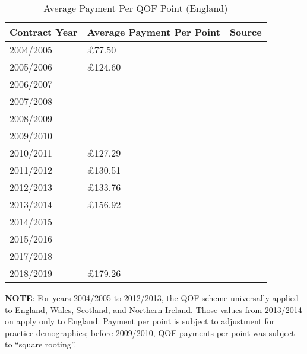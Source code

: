 \documentclass[12pt]{article}
\begin{document}
\begin{table}
  \caption{Average Payment Per QOF Point (England)}
  \begin{center}
      \begin{threeparttable}
      \begin{tabularx}{\textwidth}{|p{3cm}|p{3.5cm}|X|}
        \hline
        \textbf{Contract Year} & \textbf{Average Payment Per Point} & \textbf{Source} \\
        \hline
        2004/2005 & £77.50 & \citet{instituteofhealthcaremanagementFocusGPQuality2018}\\ \hline
        2005/2006 & £124.60 & \citet{gillamQualityOutcomesFramework2011} \\ \hline
        2006/2007 & & \\ \hline
        2007/2008 & & \\ \hline
        2008/2009 & & \\ \hline
        2009/2010 & & \\ \hline
        2010/2011 & £127.29 & \citet{instituteofhealthcaremanagementFocusGPQuality2018} \\ \hline
        2011/2012 & £130.51 & \citet{instituteofhealthcaremanagementFocusGPQuality2018} \\ \hline
        2012/2013 & £133.76 & \citet{doranSettingPerformanceTargets2014} \\ \hline
        2013/2014 & £156.92 & \citet{doranSettingPerformanceTargets2014} \\ \hline
        2014/2015 & & \\ \hline
        2015/2016 & & \\ \hline
        2017/2018 & & \\ \hline
        2018/2019 & £179.26 & \citet{instituteofhealthcaremanagementFocusGPQuality2018}\\ \hline
      \end{tabularx}
      \begin{tablenotes}
        \footnotesize
        \textbf{NOTE}: For years 2004/2005 to 2012/2013, the QOF scheme universally applied to England, Wales, Scotland, and Northern Ireland. Those values from 2013/2014 on apply only to England. Payment per point is subject to adjustment for practice demographics; before 2009/2010, QOF payments per point was subject to ``square rooting''.
      \end{tablenotes}
    \end{threeparttable}
  \end{center}
\label{QOFEnglandPaymentPerPointTimeline}
\end{table}
\end{document}
